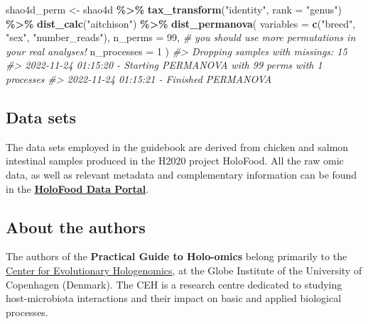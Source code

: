 \documentclass[
]{book}
\newenvironment{Shaded}{\begin{snugshade}}{\end{snugshade}}
\newcommand{\AttributeTok}[1]{\textcolor[rgb]{0.13,0.29,0.53}{#1}}
\newcommand{\CommentTok}[1]{\textcolor[rgb]{0.56,0.35,0.01}{\textit{#1}}}
\newcommand{\DecValTok}[1]{\textcolor[rgb]{0.00,0.00,0.81}{#1}}
\newcommand{\FunctionTok}[1]{\textcolor[rgb]{0.13,0.29,0.53}{\textbf{#1}}}
\newcommand{\NormalTok}[1]{#1}
\newcommand{\OtherTok}[1]{\textcolor[rgb]{0.56,0.35,0.01}{#1}}
\newcommand{\SpecialCharTok}[1]{\textcolor[rgb]{0.81,0.36,0.00}{\textbf{#1}}}
\newcommand{\StringTok}[1]{\textcolor[rgb]{0.31,0.60,0.02}{#1}}
\begin{document}
\begin{Shaded}
\begin{Highlighting}[]
\NormalTok{shao4d\_perm }\OtherTok{\textless{}{-}}\NormalTok{ shao4d }\SpecialCharTok{\%\textgreater{}\%}
  \FunctionTok{tax\_transform}\NormalTok{(}\StringTok{"identity"}\NormalTok{, }\AttributeTok{rank =} \StringTok{"genus"}\NormalTok{) }\SpecialCharTok{\%\textgreater{}\%}
  \FunctionTok{dist\_calc}\NormalTok{(}\StringTok{"aitchison"}\NormalTok{) }\SpecialCharTok{\%\textgreater{}\%}
  \FunctionTok{dist\_permanova}\NormalTok{(}
    \AttributeTok{variables =} \FunctionTok{c}\NormalTok{(}\StringTok{"breed"}\NormalTok{, }\StringTok{"sex"}\NormalTok{, }\StringTok{"number\_reads"}\NormalTok{),}
    \AttributeTok{n\_perms =} \DecValTok{99}\NormalTok{, }\CommentTok{\# you should use more permutations in your real analyses!}
    \AttributeTok{n\_processes =} \DecValTok{1}
\NormalTok{  )}
\CommentTok{\#\textgreater{} Dropping samples with missings: 15}
\CommentTok{\#\textgreater{} 2022{-}11{-}24 01:15:20 {-} Starting PERMANOVA with 99 perms with 1 processes}
\CommentTok{\#\textgreater{} 2022{-}11{-}24 01:15:21 {-} Finished PERMANOVA}
\end{Highlighting}
\end{Shaded}

\normalsize

\hypertarget{datasets}{%
\subsection*{Data sets}\label{datasets}}

The data sets employed in the guidebook are derived from chicken and salmon intestinal samples produced in the H2020 project HoloFood. All the raw omic data, as well as relevant metadata and complementary information can be found in the \textbf{\href{https://www.holofooddata.org}{HoloFood Data Portal}}.

\hypertarget{about-the-authors}{%
\subsection*{About the authors}\label{about-the-authors}}

The authors of the \textbf{Practical Guide to Holo-omics} belong primarily to the \href{https://ceh.ku.dk/}{Center for Evolutionary Hologenomics}, at the Globe Institute of the University of Copenhagen (Denmark). The CEH is a research centre dedicated to studying host-microbiota interactions and their impact on basic and applied biological processes.
\end{document}

